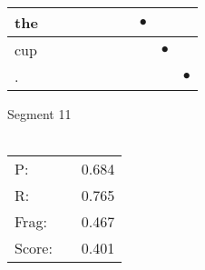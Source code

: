 \documentclass[landscape]{article}
\newcommand{\ssp}{\hspace{2pt}}
\newcommand{\mex}{\cellcolor{g}$\bullet$}
\begin{document}
\begin{tabular}{|l|p{10pt}|p{10pt}|p{10pt}|p{10pt}|p{10pt}|p{10pt}|p{10pt}|p{10pt}|p{10pt}|}
\hline
\ssp \cellcolor{ref6}the \ssp&\hspace{2pt}&\hspace{2pt}&\hspace{2pt}&\hspace{2pt}&\hspace{2pt}&\hspace{2pt}&\hspace{2pt}\mex&\hspace{2pt}&\hspace{2pt}\\
\hline
\ssp \cellcolor{ref7}cup \ssp&\hspace{2pt}&\hspace{2pt}&\hspace{2pt}&\hspace{2pt}&\hspace{2pt}&\hspace{2pt}&\hspace{2pt}&\hspace{2pt}\mex&\hspace{2pt}\\
\hline
\ssp \cellcolor{ref8}. \ssp&\hspace{2pt}&\hspace{2pt}&\hspace{2pt}&\hspace{2pt}&\hspace{2pt}&\hspace{2pt}&\hspace{2pt}&\hspace{2pt}&\hspace{2pt}\mex\\
\hline
\end{tabular}

\vspace{6pt}
\noindent Segment 11\\\\
\noindent\begin{tabular}{lm{12pt}r}
\hline
P:&&0.684\\
R:&&0.765\\
Frag:&&0.467\\
Score:&&0.401\\
\end{tabular}

\newpage
\end{document}
